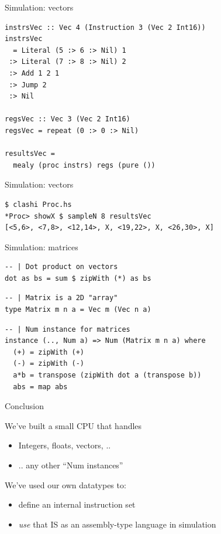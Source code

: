 \documentclass[10pt]{beamer}
\begin{document}
\begin{frame}[fragile]{Simulation: vectors}
  \begin{verbatim}
instrsVec :: Vec 4 (Instruction 3 (Vec 2 Int16))
instrsVec 
  = Literal (5 :> 6 :> Nil) 1
 :> Literal (7 :> 8 :> Nil) 2
 :> Add 1 2 1
 :> Jump 2
 :> Nil
  
regsVec :: Vec 3 (Vec 2 Int16)
regsVec = repeat (0 :> 0 :> Nil)
  
resultsVec =
  mealy (proc instrs) regs (pure ())
  \end{verbatim}
\end{frame}

\begin{frame}[fragile]{Simulation: vectors}
\begin{verbatim}
$ clashi Proc.hs 
*Proc> showX $ sampleN 8 resultsVec
[<5,6>, <7,8>, <12,14>, X, <19,22>, X, <26,30>, X]
\end{verbatim}
\end{frame}

\begin{frame}[fragile]{Simulation: matrices}
\begin{verbatim}
-- | Dot product on vectors
dot as bs = sum $ zipWith (*) as bs
\end{verbatim}

\begin{verbatim}
-- | Matrix is a 2D "array"
type Matrix m n a = Vec m (Vec n a)
\end{verbatim}

\begin{verbatim}
-- | Num instance for matrices
instance (.., Num a) => Num (Matrix m n a) where
  (+) = zipWith (+)
  (-) = zipWith (-)
  a*b = transpose (zipWith dot a (transpose b))
  abs = map abs
\end{verbatim}
\end{frame}

\begin{frame}[fragile]{Conclusion}

We've built a small CPU that handles

\begin{itemize}
\item Integers, floats, vectors, ..
\item .. any other ``Num instances''
\end{itemize}

\pause

We've used our own datatypes to:

\begin{itemize}
\item define an internal instruction set
\item \emph{use} that IS as an assembly-type language in simulation
\end{itemize}

\end{frame}
\end{document}
